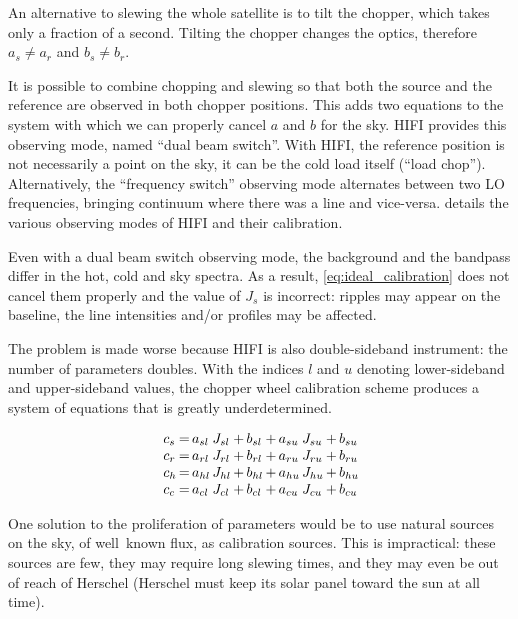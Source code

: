 An alternative to slewing the whole satellite is to tilt the chopper, which takes only a fraction of a second.
Tilting the chopper changes the optics, therefore $a_s \ne a_r$ and $b_s \ne b_r$.

It is possible to combine chopping and slewing so that both the source and the reference are observed in both chopper positions.
This adds two equations to the system with which we can properly cancel $a$ and $b$ for the sky.
HIFI provides this observing mode, named ``dual beam switch''.
With HIFI, the reference position is not necessarily a point on the sky, it can be the cold load itself (``load chop'').
Alternatively, the ``frequency switch'' observing mode alternates between two LO frequencies, bringing continuum where there was a line and vice-versa.
\Textcite{ossenkopf2002intensity} details the various observing modes of HIFI and their calibration.

Even with a dual beam switch observing mode, the background and the bandpass differ in the hot, cold and sky spectra.
As a result, \cref{eq:ideal_calibration} does not cancel them properly and the value of $J_s$ is incorrect: ripples may appear on the baseline, the line intensities and/or profiles may be affected.

The problem is made worse because HIFI is also double-sideband instrument: the number of parameters doubles.
With the indices $l$ and $u$ denoting lower-sideband and upper-sideband values, the chopper wheel calibration scheme produces a system of equations that is greatly underdetermined.

\begin{equation}
    \begin{array}{*{11}{@{\,}l@{}}}
        c_s &=& a_{sl} &J_{sl} &+& b_{sl} &+& a_{su} &J_{su} &+& b_{su} \\
        c_r &=& a_{rl} &J_{rl} &+& b_{rl} &+& a_{ru} &J_{ru} &+& b_{ru} \\
        c_h &=& a_{hl} &J_{hl} &+& b_{hl} &+& a_{hu} &J_{hu} &+& b_{hu} \\
        c_c &=& a_{cl} &J_{cl} &+& b_{cl} &+& a_{cu} &J_{cu} &+& b_{cu}
    \end{array}
\end{equation}

One solution to the proliferation of parameters would be to use natural sources on the sky, of well~known flux, as calibration sources.
This is impractical: these sources are few, they may require long slewing times, and they may even be out of reach of Herschel (Herschel must keep its solar panel toward the sun at all time).


